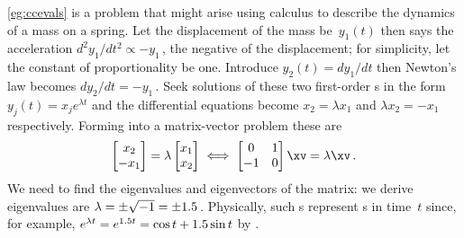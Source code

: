\cref{eg:ccevals} is a problem that might arise using calculus to describe the dynamics of a mass on a spring.  
Let the displacement of the mass be~\(y_1(t)\) then  says the acceleration \(d^2y_1/dt^2\propto -y_1\)\,, the negative of the displacement; for simplicity, let the constant of proportionality be one.  
Introduce \(y_2(t)=dy_1/dt\) then Newton's law becomes \(dy_2/dt=-y_1\)\,.  
Seek solutions of these two first-order s in the form \(y_j(t)=x_je^{\lambda t}\) and the differential equations become \(x_2=\lambda x_1\) and \(\lambda x_2=-x_1\) respectively.  
Forming into a matrix-vector problem these are
\begin{equation*}
\begin{bmatrix} x_2\\-x_1 \end{bmatrix}
=\lambda\begin{bmatrix} x_1\\x_2 \end{bmatrix}
\iff
\begin{bmatrix} 0&1\\-1&0 \end{bmatrix}\xv=\lambda\xv\,.
\end{equation*}
We need to find the eigenvalues and eigenvectors of the matrix: we derive eigenvalues are \(\lambda=\pm \sqrt{-1}=\pm 1.5\)\,. 
Physically, such s represent s in time~\(t\) since, for example, \(e^{\lambda t}=e^{1.5 t}=\cos t+1.5\sin t\) by . 








\sectionExercises



